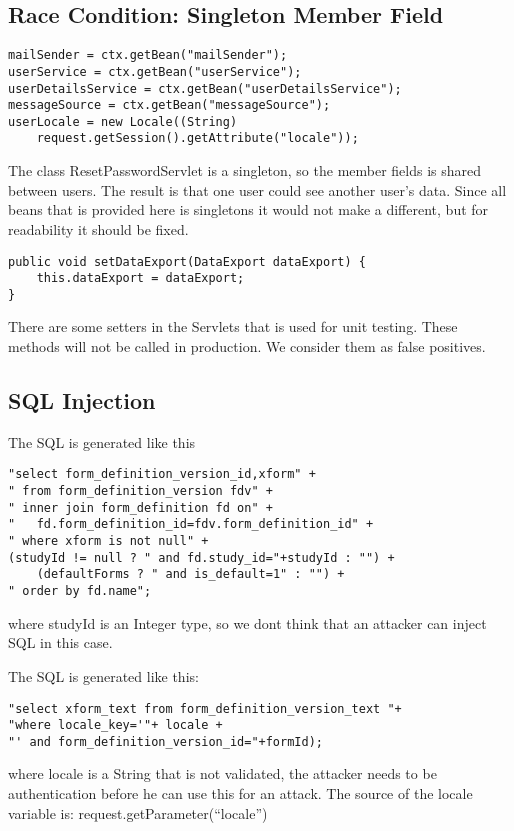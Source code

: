 \documentclass[11pt,a4paper]{article}
\theoremstyle{definition}
\begin{document}
\subsection{Race Condition: Singleton Member Field}
\begin{lstlisting}[caption=ResetPasswordServlet.java:78-82]
mailSender = ctx.getBean("mailSender");
userService = ctx.getBean("userService");
userDetailsService = ctx.getBean("userDetailsService");
messageSource = ctx.getBean("messageSource");
userLocale = new Locale((String)
	request.getSession().getAttribute("locale"));
\end{lstlisting}
The class ResetPasswordServlet is a singleton, so the member fields is shared between users.
The result is that one user could see another user's data.
Since all beans that is provided here is singletons it would not make a different, but for readability it should be fixed.


\begin{lstlisting}[caption=DataExportServlet.java:116 ++]
public void setDataExport(DataExport dataExport) {
    this.dataExport = dataExport;
}
\end{lstlisting}
There are some setters in the Servlets that is used for unit testing. These methods will not be called in production.
We consider them as false positives.

\subsection{SQL Injection}
The SQL is generated like this
\begin{lstlisting}[caption=HibernateFormDownloadDAO.java:113]
"select form_definition_version_id,xform" +
" from form_definition_version fdv" +
" inner join form_definition fd on" +
"   fd.form_definition_id=fdv.form_definition_id" +
" where xform is not null" +
(studyId != null ? " and fd.study_id="+studyId : "") +
    (defaultForms ? " and is_default=1" : "") +
" order by fd.name";
\end{lstlisting}
where studyId is an Integer type, so we dont think that an attacker can inject SQL in this case.


The SQL is generated like this:
\begin{lstlisting}[caption=HibernateFormDownloadDAO.java:149]
"select xform_text from form_definition_version_text "+
"where locale_key='"+ locale +
"' and form_definition_version_id="+formId);
\end{lstlisting}
where locale is a String that is not validated, the attacker needs to be authentication before he can use this for an attack.
The source of the locale variable is: request.getParameter(``locale'')
\end{document}
